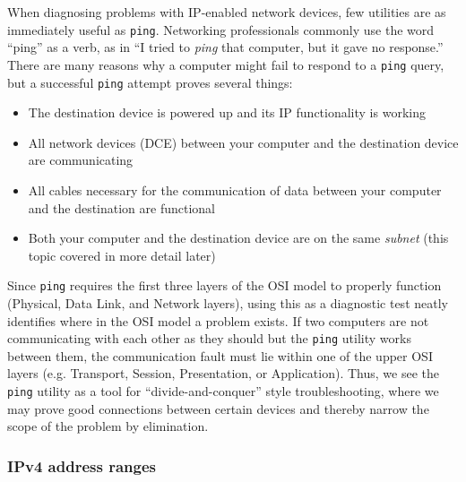 \filbreak

When diagnosing problems with IP-enabled network devices, few utilities are as immediately useful as \texttt{ping}.  Networking professionals commonly use the word ``ping'' as a verb, as in ``I tried to \textit{ping} that computer, but it gave no response.''  There are many reasons why a computer might fail to respond to a \texttt{ping} query, but a successful \texttt{ping} attempt proves several things:

\begin{itemize}
\item The destination device is powered up and its IP functionality is working
\item All network devices (DCE) between your computer and the destination device are communicating
\item All cables necessary for the communication of data between your computer and the destination are functional
\item Both your computer and the destination device are on the same \textit{subnet} (this topic covered in more detail later)
\end{itemize}

Since \texttt{ping} requires the first three layers of the OSI model to properly function (Physical, Data Link, and Network layers), using this as a diagnostic test neatly identifies where in the OSI model a problem exists.  If two computers are not communicating with each other as they should but the \texttt{ping} utility works between them, the communication fault must lie within one of the upper OSI layers (e.g. Transport, Session, Presentation, or Application).  Thus, we see the \texttt{ping} utility as a tool for ``divide-and-conquer'' style troubleshooting, where we may prove good connections between certain devices and thereby narrow the scope of the problem by elimination.  



\filbreak
\subsubsection{IPv4 address ranges}

